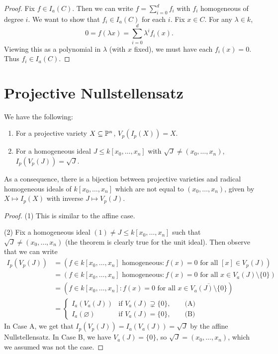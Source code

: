 \begin{proof}
  Fix $f \in I_a(C)$. Then we can
  write $f = \sum_{i = 0}^d f_i$
  with $f_i$ homogeneous of degree $i$.
  We want to show that
  $f_i \in I_a(C)$ for each $i$.
  Fix $x \in C$. For any
  $\lambda \in k$,
  \[
    0 = f(\lambda x)
    = \sum_{i = 0}^d \lambda^i f_i(x).
  \]
  Viewing this as a polynomial in
  $\lambda$ (with $x$ fixed),
  we must have each $f_i(x) = 0$.
  Thus $f_i \in I_a(C)$.
\end{proof}

\section{Projective Nullstellensatz}

\begin{theorem}
  We have the following:
  \begin{enumerate}
    \item For a projective variety
      $X \subseteq \mathbb{P}^n$,
      $V_p(I_p(X)) = X$.
    \item For a homogeneous ideal
      $J \le k[x_0, \dots, x_n]$
      with $\sqrt{J} \ne (x_0, \dots, x_n)$,
      $I_p(V_p(J)) = \sqrt{J}$.
  \end{enumerate}
  As a consequence, there is a bijection
  between projective varieties and
  radical homogeneous ideals
  of $k[x_0, \dots, x_n]$
  which are not equal to
  $(x_0, \dots, x_n)$, given by
  $X \mapsto I_p(X)$ with inverse
  $J \mapsto V_p(J)$.
\end{theorem}

\begin{proof}
  (1) This is similar to the affine case.

  (2) Fix
  a homogeneous ideal
  $(1) \ne J \le k[x_0, \dots, x_n]$
  such that $\sqrt{J} \ne (x_0, \dots, x_n)$
  (the theorem is clearly true for
  the unit ideal). Then observe
  that we can write
  \begin{align*}
    I_p(V_p(J))
    &= (f \in k[x_0, \dots, x_n] \text{ homogeneous} : f(x) = 0 \text{ for all } [x] \in V_p(J)) \\
    &= (f \in k[x_0, \dots, x_n] \text{ homogeneous} : f(x) = 0 \text{ for all } x \in V_a(J) \setminus \{0\}) \\
    &= (f \in k[x_0, \dots, x_n] : f(x) = 0 \text{ for all } x \in \overline{V_a(J) \setminus \{0\}}) \\
    &=
    \begin{cases}
      I_a(V_a(J)) & \text{if } V_a(J) \supsetneq \{0\}, \quad\quad \text{(A)} \\
      I_a(\varnothing) & \text{if } V_a(J) = \{0\}, \quad\quad \text{(B)}
    \end{cases}
  \end{align*}
  In Case A, we get that
  $I_p(V_p(J)) = I_a(V_a(J)) = \sqrt{J}$
  by the affine Nullstellensatz.
  In Case B, we have
  $V_a(J) = \{0\}$, so
  $\sqrt{J} = (x_0, \dots, x_n)$,
  which we assumed was not the case.
\end{proof}

